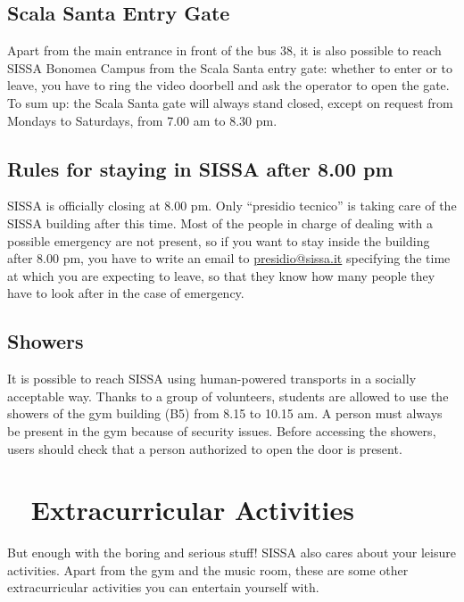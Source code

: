 \documentclass{sissavademecum}
\begin{document}
\section{Scala Santa Entry Gate}

Apart from the main entrance in front of the bus 38, it is also possible to reach SISSA Bonomea Campus from the Scala Santa entry gate: whether to enter or to leave, you have to ring the video doorbell and ask the operator to open the gate. To sum up: the Scala Santa gate will always stand closed, except on request from Mondays to Saturdays, from 7.00 am to 8.30 pm.


\section{Rules for staying in SISSA after 8.00 pm}

SISSA is officially closing at 8.00 pm. Only ``presidio tecnico'' is taking care of the SISSA building after this time. Most of the people in charge of dealing with a possible emergency are not present, so if you want to stay inside the building after 8.00 pm, you have to write an email to \href{mailto:presidio@sissa.it}{presidio@sissa.it} specifying the time at which you are expecting to leave, so that they know how many people they have to look after in the case of emergency.


\section{Showers}

It is possible to reach SISSA using human-powered transports in a socially acceptable way. Thanks to a group of volunteers, students are allowed to use the showers of the gym building (B5) from 8.15 to 10.15 am. A person must always be present in the gym because of security issues. Before accessing the showers, users should check that a person authorized to open the door is present.



\chapter{\texorpdfstring{\faFutbol\ }{} Extracurricular Activities}

But enough with the boring and serious stuff! SISSA also cares about your leisure activities. Apart from the gym and the music room, these are some other extracurricular activities you can entertain yourself with.
\end{document}
